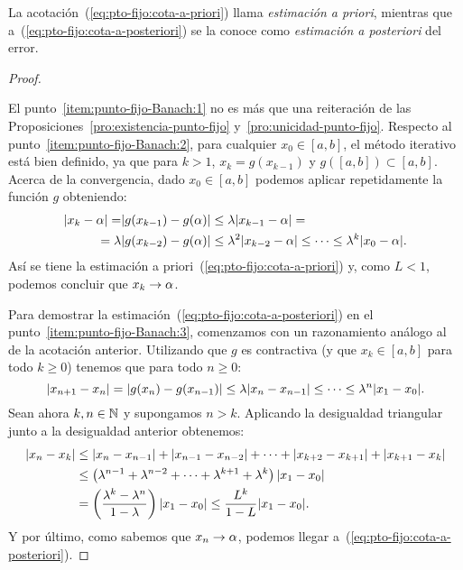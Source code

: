 La acotación~(\ref{eq:pto-fijo:cota-a-priori}) llama
\textit{estimación a priori}, mientras que
a~(\ref{eq:pto-fijo:cota-a-posteriori}) se la conoce como
\textit{estimación a posteriori} del error.

\begin{proof}~\par
  El punto~\ref{item:punto-fijo-Banach:1} no es más que una
  reiteración de las Proposiciones~\ref{pro:existencia-punto-fijo}
  y~\ref{pro:unicidad-punto-fijo}.  Respecto al
  punto~\ref{item:punto-fijo-Banach:2}, para cualquier $x_0\in [a,b]$,
  el método iterativo está bien definido, ya que para $k>1$,
  $x_{k}=g(x_{k-1})$ y $g([a,b])\subset [a,b]$.
  Acerca de la convergencia, dado $x_0\in
  [a,b]$ podemos aplicar repetidamente la función $g$ obteniendo:
  \begin{align*}
    |x_k-\alpha| = &|g(x_{k-1})-g(\alpha)| \le \lambda
    |x_{k-1}-\alpha| = \\
    = \lambda &|g(x_{k-2})-g(\alpha)| \le \lambda^2 
    |x_{k-2}-\alpha| \le \cdots \le \lambda^k |x_0-\alpha|.
  \end{align*}
  Así se tiene la estimación a
  priori~(\ref{eq:pto-fijo:cota-a-priori}) y, como
  $L<1$, podemos concluir que $x_k\to\alpha$.

  Para demostrar la estimación~(\ref{eq:pto-fijo:cota-a-posteriori})
  en el punto~\ref{item:punto-fijo-Banach:3}, comenzamos con un
  razonamiento análogo al de la acotación anterior. Utilizando que $g$
  es contractiva (y que $x_k\in [a,b]$ para todo $k\ge 0$) tenemos que
  para todo $n \ge 0$:
  \begin{equation*}
    |x_{n+1}-x_{n}| =
    |g(x_{n})-g(x_{n-1})|\le\lambda|x_{n}-x_{n-1}| \le \cdots \le \lambda^n|x_1-x_0|.
  \end{equation*}
  Sean ahora $k,n\in\operatorname{{\mathbb N}}$ y supongamos $n>k$. Aplicando la
  desigualdad triangular junto a la desigualdad anterior obtenemos:
  \begin{align*}
     |x_n-x_k| &\le |x_n-x_{n-1}| + |x_{n-1}-x_{n-2}| + \cdots +
     |x_{k+2}-x_{k+1}| + |x_{k+1}-x_{k}|
     \\
     &\le \left(\lambda^{n-1} + \lambda^{n-2} +\cdots+
       \lambda^{k+1} + \lambda^{k} \right) |x_1-x_0|
     \\
     &=\left(\frac{\lambda^k-\lambda^n}{1-\lambda}\right)
     |x_1-x_0|
     \le \frac{L^k}{1-L} |x_1-x_0|.
  \end{align*}
  Y por último, como sabemos que $x_n\to\alpha$,
  podemos llegar a~(\ref{eq:pto-fijo:cota-a-posteriori}).
\end{proof}

